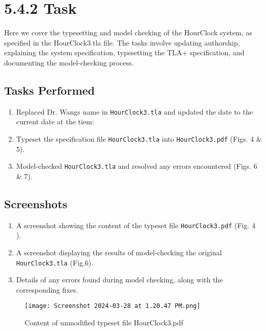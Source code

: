 \documentclass{article}
\begin{document}
\section*{5.4.2 Task}
Here we cover the typesetting and model checking of the HourClock system, as specified in the HourClock3.tla file. The tasks involve updating authorship, explaining the system specification, typesetting the TLA+ specification, and documenting the model-checking process.

\subsection*{Tasks Performed}
\begin{enumerate}
    \item Replaced Dr. Wangs name in \texttt{HourClock3.tla} and updated the date to the current date at the tiem:

    
    
    \item Typeset the specification file \texttt{HourClock3.tla} into \texttt{HourClock3.pdf} (Figs. 4 \& 5).
    \item Model-checked \texttt{HourClock3.tla} and resolved any errors encountered (Figs. 6 \& 7).
\end{enumerate}

\newpage
\subsection*{Screenshots}

\begin{enumerate}
    \item A screenshot showing the content of the typeset file \texttt{HourClock3.pdf} (Fig. 4 ).
    \item A screenshot displaying the results of model-checking the original \texttt{HourClock3.tla} (Fig.6).
    \item Details of any errors found during model checking, along with the corresponding fixes.
\end{enumerate}

\begin{figure}[H]
    \texttt{[image: Screenshot 2024-03-28 at 1.20.47 PM.png]} %
    \caption{Content of unmodified typeset file HourClock3.pdf}
    \label{fig:hourclock3pdf}
\end{figure}
\end{document}
